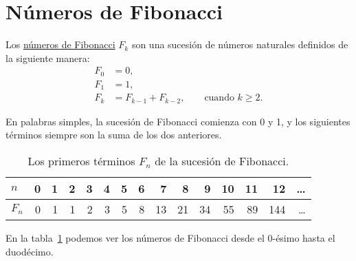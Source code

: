 \section{Números de Fibonacci}

Los
\href{http://es.wikipedia.org/wiki/N\%C3\%BAmeros\_de\_Fibonacci}{números
de Fibonacci} \(F_k\) son una sucesión de números naturales definidos de
la siguiente manera:
\begin{align*}
  F_0 &= 0, \\
  F_1 &= 1, \\
  F_k &= F_{k - 1} + F_{k - 2}, \qquad\text{cuando } k\ge 2.
\end{align*}

En palabras simples, la sucesión de Fibonacci comienza con 0 y 1, y los
siguientes términos siempre son la suma de los dos anteriores.

\begin{table}
  \begin{tabular}{l*{14}{r}}
    \toprule
    $n$   & 0 & 1 & 2 & 3 & 4 & 5 & 6 &  7 &  8 &  9 & 10 & 11 &  12 & \ldots{} \\
    \midrule
    $F_n$ & 0 & 1 & 1 & 2 & 3 & 5 & 8 & 13 & 21 & 34 & 55 & 89 & 144 & \ldots{} \\
    \bottomrule
  \end{tabular}
  \label{tbl:fibonacci}
  \caption{Los primeros términos \(F_n\) de la sucesión de Fibonacci.}
\end{table}

En la tabla~\ref{tbl:fibonacci} podemos ver los números de Fibonacci desde el
0-ésimo hasta el duodécimo.

